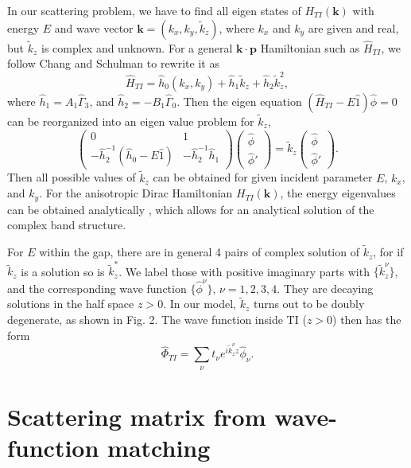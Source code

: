 \documentclass[11pt]{report}
\def\v#1{\mathbf{#1}}
\begin{document}
In our scattering problem, we have to find all eigen states of $H_{TI}(\v{k})$ with energy $E$ and 
wave vector $\v{k}=(k_x,k_y,\tilde{k}_z)$, where $k_x$ and $k_y$ are given and real, but $\tilde{k}_z$ is 
complex and unknown. For a general $\mathbf{k\cdot p}$ Hamiltonian such as $\hat{H}_{TI}$, 
we follow Chang and Schulman \cite{chang82} to rewrite it as
\[
\hat{H}_{TI}=\hat{h}_0(k_x,k_y)+\hat{h}_1 \tilde{k}_z+\hat{h}_2\tilde{k}^2_z,
\]
where $\hat{h}_1=A_1\hat{\Gamma}_3$, and $\hat{h}_2=-B_1\hat{\Gamma}_0$. 
Then the eigen equation $(\hat{H}_{TI}-E\hat{1})\hat{\phi}=0$ can be reorganized into an 
eigen value problem for $\tilde{k}_z$,
\[
\left(
\begin{array}{ll}
  0 & 1   \\
  -\hat{h}_2^{-1}(\hat{h}_0-E\hat{1}) & -\hat{h}_2^{-1}\hat{h}_1
  \end{array}
\right)
\left(
\begin{array}{l}
  \hat{\phi}   \\
  \hat{\phi}'  
\end{array}
\right)
=\tilde{k}_z \left(
\begin{array}{l}
  \hat{\phi}   \\
  \hat{\phi}'    
\end{array}
\right).
\]
Then all possible values of $\tilde{k}_z$ can be obtained for given incident parameter $E$, $k_x$, and $k_y$. 
For the anisotropic Dirac Hamiltonian $H_{TI}(\v{k})$, the energy eigenvalues can be obtained 
analytically \cite{qi_field}, which allows for an analytical solution of the complex band structure.

For $E$ within the gap, there are in general 4 pairs of complex solution of $\tilde{k}_z$, for if $\tilde{k}_z$ is a solution so is $\tilde{k}^*_z$. 
We label those with positive imaginary parts with $\{\tilde{k}^\nu_z\}$, and the corresponding wave function $\{\hat{\phi}^\nu \}$, $\nu=1,2,3,4$. They are decaying solutions in the half space $z>0$. In our model, $\tilde{k}_z$ turns out to be doubly degenerate, as shown in Fig. 2. The wave function inside TI ($z>0$) then has the form
\[
\hat{\Phi}_{TI}=\sum_{\nu} t_\nu e^{i\tilde{k}^\nu_z z} \hat{\phi}_\nu.
\]

\section{Scattering matrix from wave-function matching} 
\end{document}
